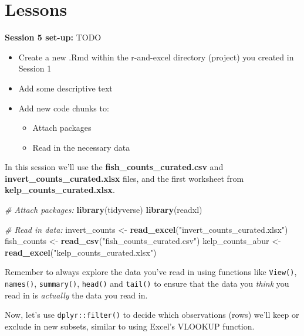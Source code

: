 \documentclass[]{book}
\newenvironment{Shaded}{\begin{snugshade}}{\end{snugshade}}
\newcommand{\CommentTok}[1]{\textcolor[rgb]{0.56,0.35,0.01}{\textit{#1}}}
\newcommand{\KeywordTok}[1]{\textcolor[rgb]{0.13,0.29,0.53}{\textbf{#1}}}
\newcommand{\NormalTok}[1]{#1}
\newcommand{\StringTok}[1]{\textcolor[rgb]{0.31,0.60,0.02}{#1}}
\providecommand{\tightlist}{%
  \setlength{\itemsep}{0pt}\setlength{\parskip}{0pt}}
\begin{document}
\hypertarget{lessons}{%
\section{Lessons}\label{lessons}}

\textbf{Session 5 set-up:} TODO

\begin{itemize}
\tightlist
\item
  Create a new .Rmd within the r-and-excel directory (project) you created in Session 1
\item
  Add some descriptive text
\item
  Add new code chunks to:

  \begin{itemize}
  \tightlist
  \item
    Attach packages
  \item
    Read in the necessary data
  \end{itemize}
\end{itemize}

In this session we'll use the \textbf{fish\_counts\_curated.csv} and \textbf{invert\_counts\_curated.xlsx} files, and the first worksheet from \textbf{kelp\_counts\_curated.xlsx}.

\begin{Shaded}
\begin{Highlighting}[]
\CommentTok{# Attach packages:}
\KeywordTok{library}\NormalTok{(tidyverse)}
\KeywordTok{library}\NormalTok{(readxl)}

\CommentTok{# Read in data: }
\NormalTok{invert_counts <-}\StringTok{ }\KeywordTok{read_excel}\NormalTok{(}\StringTok{"invert_counts_curated.xlsx"}\NormalTok{)}
\NormalTok{fish_counts <-}\StringTok{ }\KeywordTok{read_csv}\NormalTok{(}\StringTok{"fish_counts_curated.csv"}\NormalTok{)}
\NormalTok{kelp_counts_abur <-}\StringTok{ }\KeywordTok{read_excel}\NormalTok{(}\StringTok{"kelp_counts_curated.xlsx"}\NormalTok{)}
\end{Highlighting}
\end{Shaded}

Remember to always explore the data you've read in using functions like \texttt{View()}, \texttt{names()}, \texttt{summary()}, \texttt{head()} and \texttt{tail()} to ensure that the data you \emph{think} you read in is \emph{actually} the data you read in.

Now, let's use \texttt{dplyr::filter()} to decide which observations (rows) we'll keep or exclude in new subsets, similar to using Excel's VLOOKUP function.
\end{document}
